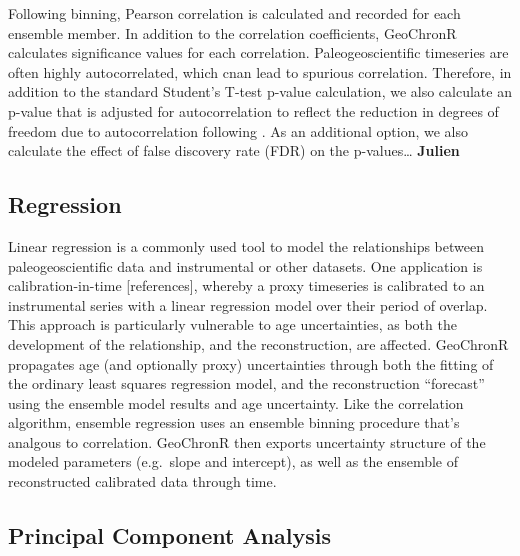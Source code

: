 \documentclass[gc, manuscript]{copernicus}
\begin{document}
Following binning, Pearson correlation is calculated and recorded for each ensemble member.
In addition to the correlation coefficients, GeoChronR calculates significance values for each correlation.
Paleogeoscientific timeseries are often highly autocorrelated, which cnan lead to spurious correlation.
Therefore, in addition to the standard Student's T-test p-value calculation, we also calculate an p-value that is adjusted for autocorrelation to reflect the reduction in degrees of freedom due to autocorrelation following \citet{bretherton1999}.
As an additional option, we also calculate the effect of false discovery rate (FDR) on the p-values\ldots{} \textbf{Julien}

\subsection{Regression}

Linear regression is a commonly used tool to model the relationships between paleogeoscientific data and instrumental or other datasets.
One application is calibration-in-time {[}references{]}, whereby a proxy timeseries is calibrated to an instrumental series with a linear regression model over their period of overlap.
This approach is particularly vulnerable to age uncertainties, as both the development of the relationship, and the reconstruction, are affected.
GeoChronR propagates age (and optionally proxy) uncertainties through both the fitting of the ordinary least squares regression model, and the reconstruction ``forecast'' using the ensemble model results and age uncertainty.
Like the correlation algorithm, ensemble regression uses an ensemble binning procedure that's analgous to correlation.
GeoChronR then exports uncertainty structure of the modeled parameters (e.g.~slope and intercept), as well as the ensemble of reconstructed calibrated data through time.

\subsection{Principal Component Analysis}
\end{document}
